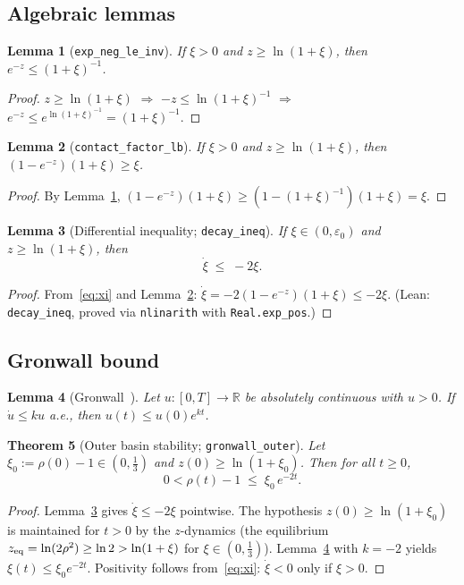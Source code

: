 \documentclass[12pt]{amsart}
\newtheorem{theorem}{Theorem}[section]
\newtheorem{lemma}[theorem]{Lemma}
\theoremstyle{definition}
\theoremstyle{remark}
\newcommand{\R}{\mathbb{R}}
\newcommand{\eps}{\varepsilon}
\newcommand{\lean}[1]{\texttt{#1}}
\begin{document}
\subsection{Algebraic lemmas}

\begin{lemma}[{\lean{exp\_neg\_le\_inv}}]\label{lem:exp}
If $\xi>0$ and $z\ge\ln(1+\xi)$, then
$e^{-z}\le(1+\xi)^{-1}$.
\end{lemma}
\begin{proof}
$z\ge\ln(1+\xi)$ $\Rightarrow$ $-z\le\ln(1+\xi)^{-1}$
$\Rightarrow$ $e^{-z}\le e^{\ln(1+\xi)^{-1}}=(1+\xi)^{-1}$.
\end{proof}

\begin{lemma}[{\lean{contact\_factor\_lb}}]\label{lem:cfact}
If $\xi>0$ and $z\ge\ln(1+\xi)$, then
$(1-e^{-z})(1+\xi)\ge\xi$.
\end{lemma}
\begin{proof}
By Lemma~\ref{lem:exp}, $(1-e^{-z})(1+\xi)
\ge(1-(1+\xi)^{-1})(1+\xi)=\xi$.
\end{proof}

\begin{lemma}[Differential inequality; {\lean{decay\_ineq}}]
\label{lem:decay}
If $\xi\in(0,\eps_0)$ and $z\ge\ln(1+\xi)$, then
\[
  \dot\xi \;\le\; -2\xi.
\]
\end{lemma}
\begin{proof}
From~\eqref{eq:xi} and Lemma~\ref{lem:cfact}:
$\dot\xi = -2(1-e^{-z})(1+\xi)\le -2\xi$.
(Lean: \lean{decay\_ineq}, proved via \lean{nlinarith}
with \lean{Real.exp\_pos}.)
\end{proof}

\subsection{Gronwall bound}

\begin{lemma}[Gronwall~\cite{Gronwall1919}]\label{lem:gronwall}
Let $u\colon[0,T]\to\R$ be absolutely continuous with $u>0$.
If $\dot u\le ku$ a.e., then $u(t)\le u(0)e^{kt}$.
\end{lemma}

\begin{theorem}[Outer basin stability;
  \lean{gronwall\_outer}]\label{thm:outer}
Let $\xi_0:=\rho(0)-1\in(0,\tfrac{1}{3})$ and
$z(0)\ge\ln(1+\xi_0)$.  Then for all $t\ge 0$,
\[
  0 < \rho(t)-1 \;\le\; \xi_0\,e^{-2t}.
\]
\end{theorem}
\begin{proof}
Lemma~\ref{lem:decay} gives $\dot\xi\le -2\xi$ pointwise.
The hypothesis $z(0)\ge\ln(1+\xi_0)$ is maintained for
$t>0$ by the $z$-dynamics (the equilibrium
$z_{\rm eq}=\ln(2\rho^2)\ge\ln 2>\ln(1+\xi)$ for
$\xi\in(0,\tfrac{1}{3})$).
Lemma~\ref{lem:gronwall} with $k=-2$ yields
$\xi(t)\le\xi_0 e^{-2t}$.
Positivity follows from~\eqref{eq:xi}: $\dot\xi<0$
only if $\xi>0$.
\end{proof}
\end{document}
